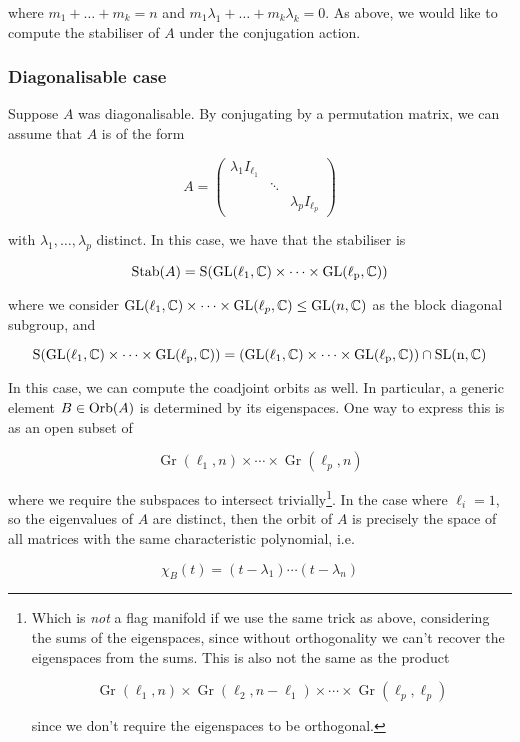 \documentclass{article}
\DeclareMathOperator{\Gr}{Gr}
\begin{document}
where \(m_1 + \dots + m_k = n\) and \(m_1\lambda_1 + \dots + m_k\lambda_k = 0\). As above, we would like to compute the stabiliser of \(A\) under the conjugation action.

\subsubsection{Diagonalisable case}

Suppose \(A\) was diagonalisable. By conjugating by a permutation matrix, we can assume that \(A\) is of the form

\[A = \begin{pmatrix}
    \lambda_1 I_{\ell_1} \\
    & \ddots \\
    & & \lambda_p I_{\ell_p}
\end{pmatrix}\]

with \(\lambda_1, \dots, \lambda_p\) distinct. In this case, we have that the stabiliser is

\[\operatorname{Stab}(A) = \rm S(\operatorname{GL}(\ell_1, \mathbb{C}) \times \cdots \times \operatorname{GL}(\ell_p, \mathbb{C}))\]

where we consider \(\operatorname{GL}(\ell_1, \mathbb{C}) \times \cdots \times \operatorname{GL}(\ell_p, \mathbb{C}) \le \operatorname{GL}(n, \mathbb{C})\) as the block diagonal subgroup, and

\[\rm S(\operatorname{GL}(\ell_1, \mathbb{C}) \times \cdots \times \operatorname{GL}(\ell_p, \mathbb{C})) = \left(\operatorname{GL}(\ell_1, \mathbb{C}) \times \cdots \times \operatorname{GL}(\ell_p, \mathbb{C})\right) \cap \operatorname{SL}(n, \mathbb{C})\]

In this case, we can compute the coadjoint orbits as well. In particular, a generic element \(B \in \operatorname{Orb}(A)\) is determined by its eigenspaces. One way to express this is as an open subset of

\[\Gr(\ell_1, n) \times \cdots \times \Gr(\ell_p, n)\]

where we require the subspaces to intersect trivially\footnote{Which is \emph{not} a flag manifold if we use the same trick as above, considering the sums of the eigenspaces, since without orthogonality we can't recover the eigenspaces from the sums. This is also not the same as the product

\[\Gr(\ell_1, n) \times \Gr(\ell_2, n - \ell_1) \times \cdots \times \Gr(\ell_p, \ell_p)\]

since we don't require the eigenspaces to be orthogonal.}. In the case where \(\ell_i = 1\), so the eigenvalues of \(A\) are distinct, then the orbit of \(A\) is precisely the space of all matrices with the same characteristic polynomial, i.e.

\[\chi_B(t) = (t - \lambda_1)\cdots(t - \lambda_n)\]
\end{document}
